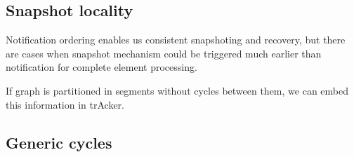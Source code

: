 \subsection{Snapshot locality}

Notification ordering enables us consistent snapshoting and recovery, but there are cases when snapshot mechanism could be triggered much earlier than notification for complete element processing.

If graph is partitioned in segments without cycles between them, we can embed this information in trAcker. 


\subsection{Generic cycles}







